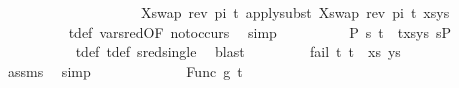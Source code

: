 \begin{isabellebody}
\ \ \ \ \ \ \ \ \ \ \ \ \ \ \ \ \ \ \ \ {\isasymturnstile}{\isacharbrackleft}{\kern0pt}{\isacharparenleft}{\kern0pt}X{\isacharcomma}{\kern0pt}swap\ {\isacharparenleft}{\kern0pt}rev\ pi{\isacharparenright}{\kern0pt}\ t{}{\isacharparenright}{\kern0pt}{\isacharbrackright}{\kern0pt}{\isasymleadsto}\ apply{\isacharunderscore}{\kern0pt}subst\ {\isacharbrackleft}{\kern0pt}{\isacharparenleft}{\kern0pt}X{\isacharcomma}{\kern0pt}swap\ {\isacharparenleft}{\kern0pt}rev\ pi{\isacharparenright}{\kern0pt}\ t{}{\isacharparenright}{\kern0pt}{\isacharbrackright}{\kern0pt}\ {\isacharparenleft}{\kern0pt}xs{\isacharcomma}{\kern0pt}ys{\isacharparenright}{\kern0pt}{\isachardoublequoteclose}\isanewline
\ \ \ \ \ \ \ \ \isamarkupfalse%
\ t{}{\isacharunderscore}{\kern0pt}def\ var{\isacharunderscore}{\kern0pt}{}{\isacharunderscore}{\kern0pt}sred{\isacharbrackleft}{\kern0pt}OF\ not{\isacharunderscore}{\kern0pt}occurs{\isacharbrackright}{\kern0pt}\ \isamarkupfalse%
\ simp\isanewline
\ \ \ \ \ \ \ \isamarkupfalse%
\ {\isachardoublequoteopen}{\isasymexists}\ P{}\ s{\isachardot}{\kern0pt}\ {\isacharparenleft}{\kern0pt}{\isacharparenleft}{\kern0pt}t{}\ {\isasymapprox}{\isacharquery}{\kern0pt}\ t{}{\isacharparenright}{\kern0pt}{\isacharhash}{\kern0pt}xs{\isacharcomma}{\kern0pt}ys{\isacharparenright}{\kern0pt}\ {\isasymTurnstile}{\isacharparenleft}{\kern0pt}{\isacharbraceleft}{\kern0pt}{\isacharbraceright}{\kern0pt}{\isacharcomma}{\kern0pt}s{\isacharparenright}{\kern0pt}{\isasymRightarrow}P{}{\isachardoublequoteclose}\isanewline
\ \ \ \ \ \ \ \ \ \isamarkupfalse%
\ t{}{\isacharunderscore}{\kern0pt}def\ t{}{\isacharunderscore}{\kern0pt}def\ sred{\isacharunderscore}{\kern0pt}single\ \isamarkupfalse%
\ blast\isanewline
\ \ \ \ \ \ \ \isamarkupfalse%
\ {\isachardoublequoteopen}fail\ {\isacharparenleft}{\kern0pt}{\isacharparenleft}{\kern0pt}t{}{\isacharcomma}{\kern0pt}\ t{}{\isacharparenright}{\kern0pt}\ {\isacharhash}{\kern0pt}\ xs{\isacharcomma}{\kern0pt}\ ys{\isacharparenright}{\kern0pt}{\isachardoublequoteclose}\ \isanewline
\ \ \ \ \ \ \ \ \ \isamarkupfalse%
\ assms\ \isamarkupfalse%
\ simp\isanewline
\ \ \ \ \isamarkupfalse%
\isanewline
\ \ \isamarkupfalse%
\isanewline
\ \ \ \ \isamarkupfalse%
\ {\isacharparenleft}{\kern0pt}Func\ g\ t{}{\isacharprime}{\kern0pt}{\isacharparenright}{\kern0pt}\isanewline

\end{isabellebody}
